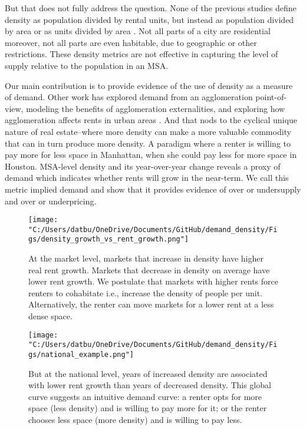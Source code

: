 \documentclass[sn-mathphys-num]{sn-jnl}%
\theoremstyle{thmstyleone}%
\theoremstyle{thmstyletwo}%
\theoremstyle{thmstylethree}%
\begin{document}
But that does not fully address the question. None of the previous studies define density as population divided by rental units, but instead as population divided by area or as units divided by area . Not all parts of a city are residential moreover, not all parts are even habitable, due to geographic or other restrictions. These density metrics are not effective in capturing the level of supply relative to the population in an MSA.  

Our main contribution is to provide evidence of the use of density as a measure of demand. Other work has explored demand from an agglomeration point-of-view, modeling the benefits of agglomeration externalities, and exploring how agglomeration affects rents in urban areas \cite{titman2024city} \cite{liu2018vertical}. And that nods to the cyclical unique nature of real estate--where more density can make a more valuable commodity that can in turn produce more density. A paradigm where a renter is willing to pay more for less space in Manhattan, when she could pay less for more space in Houston. MSA-level density and its year-over-year change reveals a proxy of demand which indicates whether rents will grow in the near-term. We call this metric implied demand and show that it provides evidence of over or undersupply and over or underpricing.  

\begin{figure}[H]
	\centering
	\texttt{[image: "C:/Users/datbu/OneDrive/Documents/GitHub/demand\_density/Figs/density\_growth\_vs\_rent\_growth.png"]}
	\caption{At the market level, markets that increase in density have higher real rent growth. Markets that decrease in density on average have lower rent growth. We postulate that markets with higher rents force renters to cohabitate i.e., increase the density of people per unit. Alternatively, the renter can move markets for a lower rent at a less dense space.}\label{fig1}
\end{figure}

\begin{figure}[H]
	\centering
	\texttt{[image: "C:/Users/datbu/OneDrive/Documents/GitHub/demand\_density/Figs/national\_example.png"]}
	\caption{But at the national level, years of increased density are associated with lower rent growth than years of decreased density. This global curve suggests an intuitive demand curve: a renter opts for more space (less density) and is willing to pay more for it; or the renter chooses less space (more density) and is willing to pay less.}\label{fig4}
\end{figure}
\end{document}
